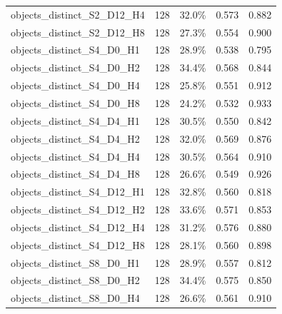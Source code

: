 \documentclass[11pt]{article}
\begin{document}
\begin{longtable}{p{}rrrr}
objects\_\allowbreak{}distinct\_\allowbreak{}S2\_\allowbreak{}D12\_\allowbreak{}H4 & 128 & 32.0\% & 0.573 & 0.882\\
objects\_\allowbreak{}distinct\_\allowbreak{}S2\_\allowbreak{}D12\_\allowbreak{}H8 & 128 & 27.3\% & 0.554 & 0.900\\
objects\_\allowbreak{}distinct\_\allowbreak{}S4\_\allowbreak{}D0\_\allowbreak{}H1 & 128 & 28.9\% & 0.538 & 0.795\\
objects\_\allowbreak{}distinct\_\allowbreak{}S4\_\allowbreak{}D0\_\allowbreak{}H2 & 128 & 34.4\% & 0.568 & 0.844\\
objects\_\allowbreak{}distinct\_\allowbreak{}S4\_\allowbreak{}D0\_\allowbreak{}H4 & 128 & 25.8\% & 0.551 & 0.912\\
objects\_\allowbreak{}distinct\_\allowbreak{}S4\_\allowbreak{}D0\_\allowbreak{}H8 & 128 & 24.2\% & 0.532 & 0.933\\
objects\_\allowbreak{}distinct\_\allowbreak{}S4\_\allowbreak{}D4\_\allowbreak{}H1 & 128 & 30.5\% & 0.550 & 0.842\\
objects\_\allowbreak{}distinct\_\allowbreak{}S4\_\allowbreak{}D4\_\allowbreak{}H2 & 128 & 32.0\% & 0.569 & 0.876\\
objects\_\allowbreak{}distinct\_\allowbreak{}S4\_\allowbreak{}D4\_\allowbreak{}H4 & 128 & 30.5\% & 0.564 & 0.910\\
objects\_\allowbreak{}distinct\_\allowbreak{}S4\_\allowbreak{}D4\_\allowbreak{}H8 & 128 & 26.6\% & 0.549 & 0.926\\
objects\_\allowbreak{}distinct\_\allowbreak{}S4\_\allowbreak{}D12\_\allowbreak{}H1 & 128 & 32.8\% & 0.560 & 0.818\\
objects\_\allowbreak{}distinct\_\allowbreak{}S4\_\allowbreak{}D12\_\allowbreak{}H2 & 128 & 33.6\% & 0.571 & 0.853\\
objects\_\allowbreak{}distinct\_\allowbreak{}S4\_\allowbreak{}D12\_\allowbreak{}H4 & 128 & 31.2\% & 0.576 & 0.880\\
objects\_\allowbreak{}distinct\_\allowbreak{}S4\_\allowbreak{}D12\_\allowbreak{}H8 & 128 & 28.1\% & 0.560 & 0.898\\
objects\_\allowbreak{}distinct\_\allowbreak{}S8\_\allowbreak{}D0\_\allowbreak{}H1 & 128 & 28.9\% & 0.557 & 0.812\\
objects\_\allowbreak{}distinct\_\allowbreak{}S8\_\allowbreak{}D0\_\allowbreak{}H2 & 128 & 34.4\% & 0.575 & 0.850\\
objects\_\allowbreak{}distinct\_\allowbreak{}S8\_\allowbreak{}D0\_\allowbreak{}H4 & 128 & 26.6\% & 0.561 & 0.910\\

\end{longtable}
\end{document}
